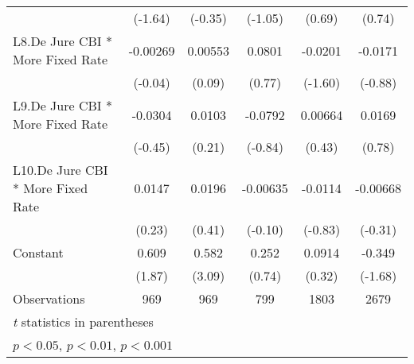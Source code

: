 {\begin{tabular}{l*{5}{c}}
                                        &(-1.64)         &(-0.35)         &(-1.05)         &(0.69)         &(0.74)         \\
\addlinespace
L8.De Jure CBI * More Fixed Rate        &-0.00269         &0.00553         &0.0801         &-0.0201         &-0.0171         \\
                                        &(-0.04)         &(0.09)         &(0.77)         &(-1.60)         &(-0.88)         \\
\addlinespace
L9.De Jure CBI * More Fixed Rate        &-0.0304         &0.0103         &-0.0792         &0.00664         &0.0169         \\
                                        &(-0.45)         &(0.21)         &(-0.84)         &(0.43)         &(0.78)         \\
\addlinespace
L10.De Jure CBI * More Fixed Rate       &0.0147         &0.0196         &-0.00635         &-0.0114         &-0.00668         \\
                                        &(0.23)         &(0.41)         &(-0.10)         &(-0.83)         &(-0.31)         \\
\addlinespace
Constant                                &0.609         &0.582\sym{**} &0.252         &0.0914         &-0.349         \\
                                        &(1.87)         &(3.09)         &(0.74)         &(0.32)         &(-1.68)         \\
\midrule
Observations                            &  969         &  969         &  799         & 1803         & 2679         \\
\bottomrule
\multicolumn{6}{l}{\footnotesize \textit{t} statistics in parentheses}\\
\multicolumn{6}{l}{\footnotesize \sym{*} \(p<0.05\), \sym{**} \(p<0.01\), \sym{***} \(p<0.001\)}\\
\end{tabular}
}

